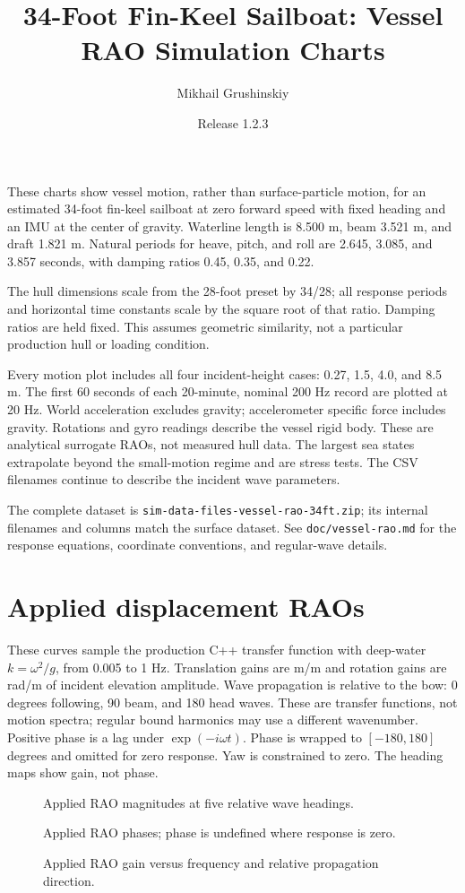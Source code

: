 \documentclass[11pt,letterpaper]{article}
\title{34-Foot Fin-Keel Sailboat: Vessel RAO Simulation Charts}
\author{Mikhail Grushinskiy}
\date{Release 1.2.3}
\newcommand{\VesselChart}[2]{
  \begin{figure}[H]\centering
  \resizebox{\textwidth}{!}{}
  \caption{#2}
  \end{figure}\clearpage
}
\begin{document}
\maketitle
These charts show vessel motion, rather than surface-particle motion, for an
estimated 34-foot fin-keel sailboat at zero forward speed with fixed heading
and an IMU at the center of gravity. Waterline length is 8.500 m, beam 3.521 m,
and draft 1.821 m. Natural periods for heave, pitch, and roll are 2.645, 3.085,
and 3.857 seconds, with damping ratios 0.45, 0.35, and 0.22.

The hull dimensions scale from the 28-foot preset by 34/28; all response
periods and horizontal time constants scale by the square root of that ratio.
Damping ratios are held fixed. This assumes geometric similarity, not a
particular production hull or loading condition.

Every motion plot includes all four incident-height cases: 0.27, 1.5, 4.0, and 8.5 m.
The first 60 seconds of each 20-minute, nominal 200 Hz record are plotted at
20 Hz. World acceleration excludes gravity; accelerometer specific force
includes gravity. Rotations and gyro readings describe the vessel rigid body.
These are analytical surrogate RAOs, not measured hull data. The largest sea
states extrapolate beyond the small-motion regime and are stress tests.
The CSV filenames continue to describe the incident wave parameters.

The complete dataset is \texttt{sim-data-files-vessel-rao-34ft.zip}; its internal
filenames and columns match the surface dataset. See \texttt{doc/vessel-rao.md}
for the response equations, coordinate conventions, and regular-wave details.
\clearpage
\section{Applied displacement RAOs}
These curves sample the production C++ transfer function with deep-water
$k=\omega^2/g$, from 0.005 to 1 Hz. Translation gains are m/m and rotation
gains are rad/m of incident elevation amplitude. Wave propagation is relative
to the bow: 0 degrees following, 90 beam, and 180 head waves. These are
transfer functions, not motion spectra; regular bound harmonics may use a
different wavenumber. Positive phase is a lag under $\exp(-i\omega t)$.
Phase is wrapped to $[-180,180]$ degrees and omitted for zero response.
Yaw is constrained to zero. The heading maps show gain, not phase.
\VesselChart{response_gain}{Applied RAO magnitudes at five relative wave headings.}
\VesselChart{response_phase}{Applied RAO phases; phase is undefined where response is zero.}
\VesselChart{response_heading}{Applied RAO gain versus frequency and relative propagation direction.}
\end{document}
